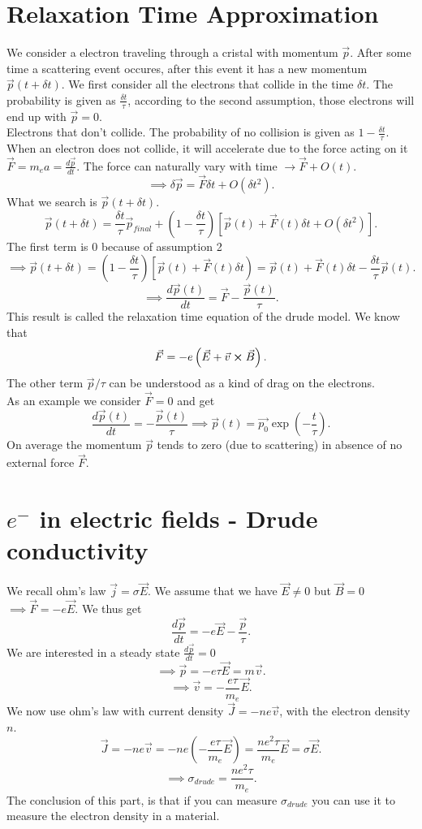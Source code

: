 \documentclass{report}
\begin{document}
\section{Relaxation Time Approximation}
We consider a electron traveling through a cristal with momentum $\vec{p}$. After some time a scattering event occures, after this event it has a new momentum $\vec{p}\left( t + \delta t \right) $.
We first consider all the electrons that collide in the time $\delta t$. The probability is given as $\frac{\delta t}{\tau}$, according to the second assumption, those electrons will end up with $\vec{p}=0$.\\
Electrons that don't collide. The probability of no collision is given as $1 - \frac{\delta t}{\tau}$. When an electron does not collide, it will accelerate due to the force acting on it $\vec{F} = m_e a = \frac{d \vec{p}}{dt}$. The force can naturally vary with time $\to \vec{F} + O(t)$. \[
	\implies \delta\vec{p} = \vec{F} \delta t + O\left( \delta t^2 \right) 
.\] What we search is $\vec{p}\left( t + \delta t \right) $. \[
\vec{p}\left( t+ \delta t \right) = \frac{\delta t}{\tau} \vec{p}_{final} + \left( 1-\frac{\delta t}{\tau} \right) \left[ \vec{p}(t) + \vec{F}(t)\delta t + O\left( \delta t^2 \right)  \right]
.\] The first term is $0$ because of assumption 2 \[
\implies \vec{p}\left( t + \delta t \right) = \left( 1- \frac{\delta t}{\tau} \right) \left[ \vec{p}(t) + \vec{F}(t) \delta t \right) = \vec{p}(t) + \vec{F}(t) \delta t - \frac{\delta t}{\tau}\vec{p}(t)
.\] \[
\implies \frac{d\vec{p}(t)}{dt} = \vec{F} - \frac{\vec{p}(t)}{\tau}
.\] This result is called the relaxation time equation of the drude model. We know that \[
\vec{F} = -e\left( \vec{E} + \vec{v} \cross \vec{B} \right) 
.\] The other term $\vec{p}/\tau$ can be understood as a kind of drag on the electrons.\\
As an example we consider $\vec{F} = 0$ and get \[
	\frac{d\vec{p}(t)}{dt} = - \frac{\vec{p}(t)}{\tau} \implies \vec{p}(t) = \vec{p_0} \exp\left( - \frac{t}{\tau} \right) 
.\] 
On average the momentum $\vec{p}$ tends to zero (due to scattering) in absence of no external force $\vec{F}$.\\
\section{$e^-$ in electric fields - Drude conductivity}
We recall ohm's law $\vec{j} = \sigma \vec{E}$. We assume that we have $\vec{E} \neq 0$ but $\vec{B} = 0$ $\implies \vec{F} = -e\vec{E}$. We thus get \[
	\frac{d\vec{p}}{dt} = -e \vec{E} - \frac{\vec{p}}{\tau}
.\] We are interested in a steady state $\frac{d\vec{p}}{dt}=0$ \[
\implies \vec{p} = -e \tau \vec{E} = m \vec{v}
.\] \[
\implies \vec{v} = -\frac{e\tau}{m_e}\vec{E}
.\] We now use ohm's law with current density $\vec{J} = -ne\vec{v}$, with the electron density $n$. \[
\vec{J} = -ne\vec{v} = -ne\left( - \frac{e\tau}{m_e} \vec{E} \right) = \frac{n e^2 \tau}{m_e} \vec{E} = \sigma \vec{E}
.\] \[
\implies \sigma_{drude} = \frac{ne^2\tau}{m_e}
.\] 
The conclusion of this part, is that if you can measure $\sigma_{drude}$ you can use it to measure the electron density in a material.
\end{document}
